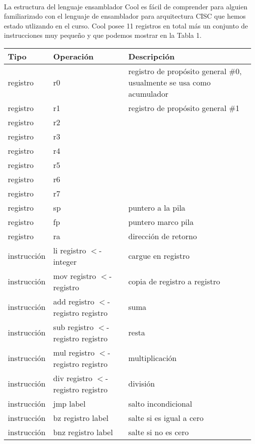 \documentclass[10pt,a4paper]{article}
\begin{document}
\paragraph{}
La estructura del lenguaje ensamblador Cool es fácil de comprender para alguien familiarizado con el lenguaje de ensamblador para arquitectura CISC que hemos estado utlizando en el curso. Cool posee 11 registros en total más un conjunto de instrucciones muy pequeño y que podemos mostrar en la Tabla 1.
\begin{center}
\begin{table}
\begin{tabular}{| l | l | p{5cm} |}
\hline
Tipo & Operación & Descripción \\ \hline
registro & r0 & registro de propósito general \#0, usualmente se usa como acumulador \\ \hline
registro & r1 & registro de propósito general \#1 \\ \hline
registro & r2 & \\ \hline
registro & r3 &  \\ \hline
registro & r4 &  \\ \hline
registro & r5 &  \\ \hline
registro & r6 &  \\ \hline
registro & r7 &  \\ \hline
registro & sp & puntero a la pila \\ \hline
registro & fp & puntero marco pila \\ \hline
registro & ra & dirección de retorno \\ \hline
instrucción & li registro $<$- integer & cargue en registro  \\ \hline 
instrucción & mov registro $<$- registro & copia de registro a registro  \\ \hline
instrucción & add registro $<$- registro registro & suma\\ \hline
instrucción & sub registro $<$- registro registro & resta\\ \hline
instrucción & mul registro $<$- registro registro & multiplicación\\ \hline
instrucción & div registro $<$- registro registro & división \\ \hline
instrucción & jmp label & salto incondicional \\ \hline
instrucción & bz registro label & salte si es igual a cero\\ \hline 
instrucción & bnz registro label & salte si no es cero  \\ \hline

\end{tabular}
\end{table}
\end{center}
\end{document}

